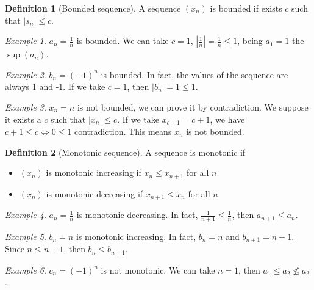 \documentclass{article}
\newcommand{\abs}[1]{\left|#1\right|}
\newcommand{\fr}[2]{\frac{#1}{#2}}
\theoremstyle{definition}
\newtheorem{definition}{Definition}[section]
\theoremstyle{definition}
\theoremstyle{plain}
\theoremstyle{plain}
\theoremstyle{plain}
\theoremstyle{plain}
\theoremstyle{definition}
\theoremstyle{remark}
\newtheorem{exampled}{Example}[definition]
\theoremstyle{remark}
\theoremstyle{remark}
\theoremstyle{remark}
\begin{document}
\begin{definition}[Bounded sequence]
  A sequence $(x_n)$ is bounded if exists $c$ such that $\abs{s_n} \leq c$.
\end{definition}

\begin{exampled}
  $a_n = \frac{1}{n}$ is bounded. We can take $c = 1$, $\abs{\frac{1}{n}} = \frac{1}{n} \leq 1$, being $a_1 = 1$ the $\sup(a_n)$.
\end{exampled}

\begin{exampled}
  $b_n = (-1)^n$ is bounded. In fact, the values of the sequence are always 1 and -1. If we take $c = 1$, then $\abs{b_n} = 1 \leq 1$.
\end{exampled}

\begin{exampled}
  $x_n = n$ is not bounded, we can prove it by contradiction. We suppose it exists a $c$ such that $\abs{x_n} \leq c$. If we take $x_{c+1} = c + 1$, we have $c + 1 \leq c \iff 0 \leq 1$ contradiction. This means $x_n$ is not bounded.
\end{exampled}


\begin{definition}[Monotonic sequence]
  A sequence is monotonic if
  \begin{itemize}
    \item $(x_n)$ is monotonic increasing if $x_n \leq x_{n+1}$ for all $n$
    \item $(x_n)$ is monotonic decreasing if $x_{n+1} \leq x_n$ for all $n$
  \end{itemize}
\end{definition}

\begin{exampled}
  $a_n = \fr{1}{n}$ is monotonic decreasing. In fact, $\fr{1}{n+1} \leq \fr{1}{n}$, then $a_{n+1} \leq a_n$.
\end{exampled}

\begin{exampled}
  $b_n = n$ is monotonic increasing. In fact, $b_n = n$ and $b_{n+1} = n + 1$. Since $n \leq n + 1$, then $b_n \leq b_{n+1}$.
\end{exampled}

\begin{exampled}
  $c_n = (-1)^n$ is not monotonic. We can take $n = 1$, then $a_1 \leq a_2 \nleq a_3$.
\end{exampled}
\end{document}

